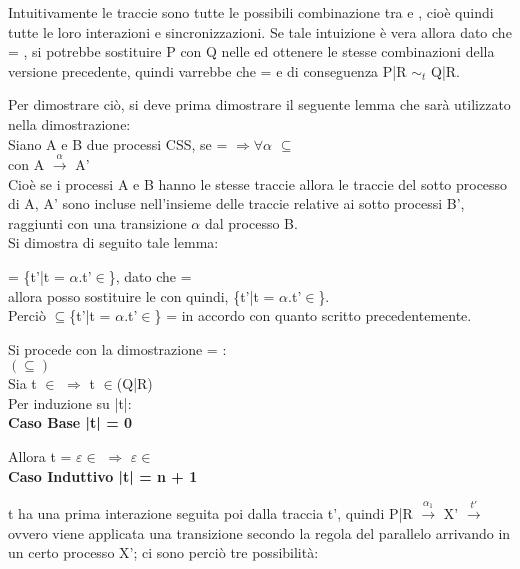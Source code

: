 Intuitivamente le traccie  sono tutte le possibili combinazione tra  e , cioè quindi tutte le loro interazioni e sincronizzazioni. Se tale intuizione è vera allora dato che  = , si potrebbe sostituire P con Q nelle  ed ottenere le stesse combinazioni della versione precedente, quindi varrebbe che  =  e di conseguenza P|R $\sim_{t}$ Q|R.

Per dimostrare ciò, si deve prima dimostrare il seguente lemma che sarà utilizzato nella dimostrazione:\\
Siano A e B due processi CSS, se  =  $\Rightarrow \forall\alpha$ $\subseteq$ \\con A $ \overset{\alpha}\rightarrow $ A'\\
Cioè se i processi A e B hanno le stesse traccie allora le traccie del sotto processo di A, A' sono incluse nell'insieme delle traccie relative ai sotto processi B', raggiunti con una transizione $\alpha$ dal processo B.\\

Si dimostra di seguito tale lemma:

 = \{t'|t = $\alpha$.t'$\in$\}, dato che  =  \\
allora posso sostituire le  con  quindi, \{t'|t = $\alpha$.t'$\in$\}.\\
Perciò $\subseteq$\{t'|t = $\alpha$.t'$\in$\} =  in accordo con quanto scritto precedentemente.

Si procede con la dimostrazione  = :\\

$(\subseteq)$ 
\\

Sia t $\in$  $\Rightarrow$  t $\in$(Q|R)\\
Per induzione su |t|:\\

\textbf{Caso Base |t| = 0}

Allora t = $\varepsilon \in$ $\Rightarrow$ $\varepsilon \in$
\\

\textbf{Caso Induttivo |t| = n + 1}

t ha una prima interazione seguita poi dalla traccia t', quindi P|R $ \overset{\alpha_{1}}\rightarrow $ X' $\overset{t'}\rightarrow$ ovvero viene applicata una transizione secondo la regola del parallelo arrivando in un certo processo X'; ci sono perciò tre possibilità:

